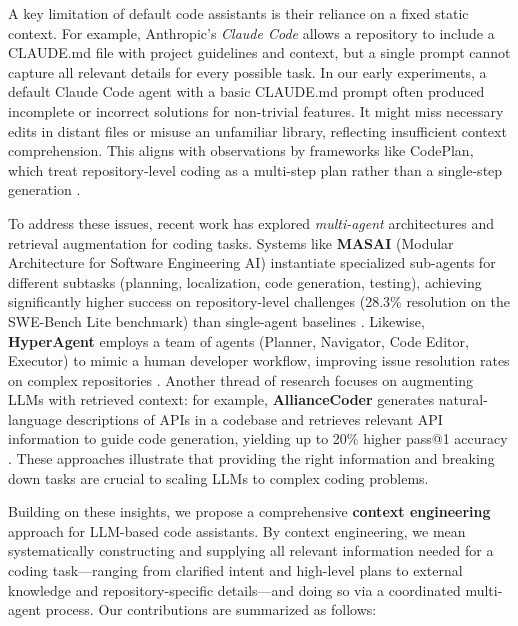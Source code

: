 \documentclass[11pt]{article}
\begin{document}
A key limitation of default code assistants is their reliance on a fixed static context. For example, Anthropic's \textit{Claude Code} allows a repository to include a CLAUDE.md file with project guidelines and context, but a single prompt cannot capture all relevant details for every possible task. In our early experiments, a default Claude Code agent with a basic CLAUDE.md prompt often produced incomplete or incorrect solutions for non-trivial features. It might miss necessary edits in distant files or misuse an unfamiliar library, reflecting insufficient context comprehension. This aligns with observations by frameworks like CodePlan, which treat repository-level coding as a multi-step plan rather than a single-step generation \cite{codeplan2025,masai2024}.

To address these issues, recent work has explored \emph{multi-agent} architectures and retrieval augmentation for coding tasks. Systems like \textbf{MASAI} (Modular Architecture for Software Engineering AI) instantiate specialized sub-agents for different subtasks (planning, localization, code generation, testing), achieving significantly higher success on repository-level challenges (28.3\% resolution on the SWE-Bench Lite benchmark) than single-agent baselines \cite{masai2024}. Likewise, \textbf{HyperAgent} employs a team of agents (Planner, Navigator, Code Editor, Executor) to mimic a human developer workflow, improving issue resolution rates on complex repositories \cite{hyperagent2024}. Another thread of research focuses on augmenting LLMs with retrieved context: for example, \textbf{AllianceCoder} generates natural-language descriptions of APIs in a codebase and retrieves relevant API information to guide code generation, yielding up to 20\% higher pass@1 accuracy \cite{alliancecoder2025}. These approaches illustrate that providing the right information and breaking down tasks are crucial to scaling LLMs to complex coding problems.

Building on these insights, we propose a comprehensive \textbf{context engineering} approach for LLM-based code assistants. By context engineering, we mean systematically constructing and supplying all relevant information needed for a coding task—ranging from clarified intent and high-level plans to external knowledge and repository-specific details—and doing so via a coordinated multi-agent process. Our contributions are summarized as follows:
\end{document}

